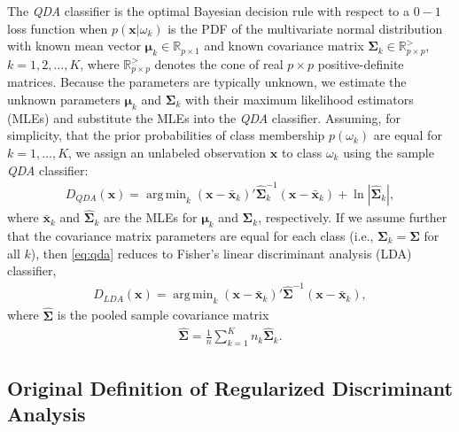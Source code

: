 \documentclass[11pt]{article}
\newcommand{\xbar}{\bar{\bm x}}
\DeclareMathOperator*{\argmin}{arg\,min}
\begin{document}
The \emph{QDA} classifier is the optimal Bayesian decision rule with respect to a $0-1$ loss function when $p(\bm x | \omega_k)$ is the PDF of the multivariate normal distribution with known mean vector  $\bm\mu_k \in \mathbb{R}_{p \times 1}$ and known covariance matrix $\bm\Sigma_k \in \mathbb{R}_{p \times p}^{>}$, $k = 1, 2, \ldots, K$, where $\mathbb{R}_{p \times p}^{>}$ denotes the cone of real $p \times p$ positive-definite matrices. Because the parameters are typically unknown, we estimate the unknown parameters $\bm \mu_k$ and $\bm\Sigma_k$ with their maximum likelihood estimators (MLEs) and substitute the MLEs into the \emph{QDA} classifier. Assuming, for simplicity, that the prior probabilities of class membership $p(\omega_k)$ are equal for $k = 1, \ldots, K$, we assign an unlabeled observation $\bm x$ to class $\omega_k$ using the sample \emph{QDA} classifier:
\begin{align}
	D_{QDA}(\bm x) = \argmin_{k}  (\bm x - \xbar_k)'\widehat{\bm\Sigma}_k^{-1}(\bm x - \xbar_k)  + \ln |\widehat{\bm\Sigma}_k|, \label{eq:qda}
\end{align}
where $\xbar_k$ and $\widehat{\bm\Sigma}_k$ are the MLEs for $\bm \mu_k$ and $\bm \Sigma_k$, respectively. If we assume further that the covariance matrix parameters are equal for each class (i.e., $\bm\Sigma_k = \bm\Sigma$ for all $k$), then \eqref{eq:qda} reduces to Fisher's linear discriminant analysis (LDA) classifier,
\begin{align}
	D_{LDA}(\bm x) = \argmin_{k}  (\bm x - \xbar_k)'\widehat{\bm\Sigma}^{-1}(\bm x - \xbar_k), \label{eq:lda}
\end{align}
where $\widehat{\bm\Sigma}$ is the pooled sample covariance matrix
\begin{align}
	\widehat{\bm\Sigma} = \frac{1}{n} \sum_{k=1}^K n_k \widehat{\bm\Sigma}_k. \label{eq:pooled-cov}
\end{align}

\subsection{Original Definition of Regularized Discriminant Analysis}
\end{document}
